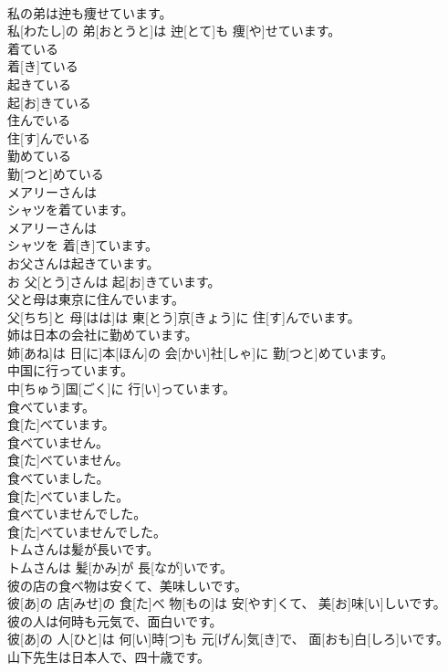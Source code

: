 \documentclass[8pt]{extreport}
\begin{document}
\begin{CJK}{UTF8}{min}
\\	私の弟は迚も痩せています。	
\\	私[わたし]の 弟[おとうと]は 迚[とて]も 痩[や]せています。
\\	着ている	
\\	着[き]ている
\\	起きている	
\\	起[お]きている
\\	住んでいる	
\\	住[す]んでいる
\\	勤めている	
\\	勤[つと]めている
\\	メアリーさんは
\\	シャツを着ています。	
\\	メアリーさんは 
\\	シャツを 着[き]ています。
\\	お父さんは起きています。	
\\	お 父[とう]さんは 起[お]きています。
\\	父と母は東京に住んでいます。	
\\	父[ちち]と 母[はは]は 東[とう]京[きょう]に 住[す]んでいます。
\\	姉は日本の会社に勤めています。	
\\	姉[あね]は 日[に]本[ほん]の 会[かい]社[しゃ]に 勤[つと]めています。
\\	中国に行っています。	
\\	中[ちゅう]国[ごく]に 行[い]っています。
\\	食べています。	
\\	食[た]べています。
\\	食べていません。	
\\	食[た]べていません。
\\	食べていました。	
\\	食[た]べていました。
\\	食べていませんでした。	
\\	食[た]べていませんでした。
\\	トムさんは髪が長いです。	
\\	トムさんは 髪[かみ]が 長[なが]いです。
\\	彼の店の食べ物は安くて、美味しいです。	
\\	彼[あ]の 店[みせ]の 食[た]べ 物[もの]は 安[やす]くて、 美[お]味[い]しいです。
\\	彼の人は何時も元気で、面白いです。	
\\	彼[あ]の 人[ひと]は 何[い]時[つ]も 元[げん]気[き]で、 面[おも]白[しろ]いです。
\\	山下先生は日本人で、四十歳です。	

\end{CJK}
\end{document}
